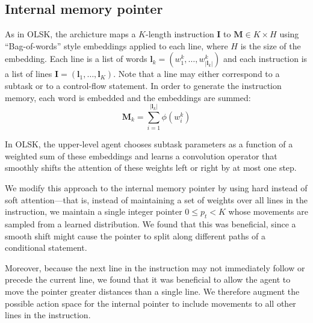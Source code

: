 \documentclass{article}
\begin{document}
\subsection{Internal memory pointer}
\label{internal-memory-pointer}
As in OLSK, the archicture maps a $K$-length instruction
$\mathbf{I}$ to
$\mathbf{M} \in K\times H$ using ``Bag-of-words'' style
embeddings applied to each line, where $H$ is the size of the embedding.  Each line is
a list of words $\mathbf{l}_k = \left(w^k_1,\dots,w^k_{|\mathbf{l}_k|}\right)$ and each instruction is
a list of lines $\mathbf{I} = \left(\mathbf{l}_1,\dots,\mathbf{l}_{K}\right)$. Note that a
line may either correspond to a subtask or to a control-flow statement.
In order to generate the instruction memory, each word is embedded and the
embeddings are summed:
\begin{equation}
  \mathbf{M}_k = \sum_{i=1}^{|\mathbf{l}_k|} \phi\left(w^k_i\right)
\end{equation}

In OLSK, the
upper-level agent chooses 
subtask parameters as a function of a weighted sum of these
embeddings and learns a convolution operator 
that smoothly shifts the attention of these weights left or right by at most one step.

We modify this approach to the internal memory pointer by using hard instead of
soft attention---that is, instead of maintaining a set of weights over all
lines in the instruction, we maintain a single integer pointer $0 \le p_t < K$ 
whose movements are sampled from a learned distribution. We found that this was beneficial, since a smooth shift might
cause the pointer to split along different paths of a conditional statement.

Moreover, because the next line in the instruction may not immediately follow or
precede the current line, we found that it was beneficial to allow the agent to
move the pointer greater distances than a single line. We therefore augment the
possible action space for the internal pointer to include movements to all other
lines in the instruction.
\end{document}
